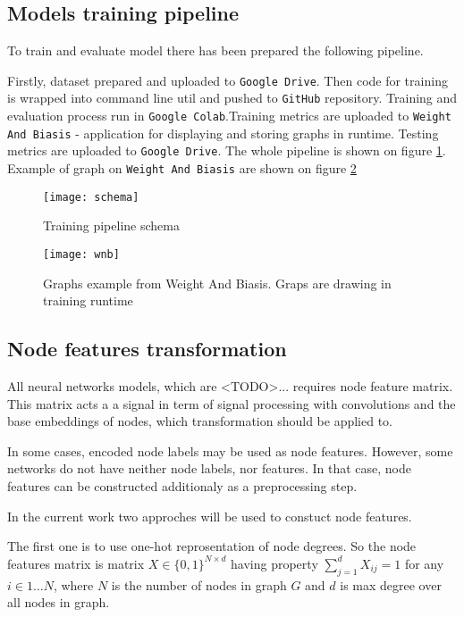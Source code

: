 \subsection{Models training pipeline}


To train and evaluate model there has been prepared the following pipeline.

Firstly, dataset prepared and uploaded to \texttt{Google Drive}. Then code for training is wrapped
into command line util and pushed to \texttt{GitHub} repository. Training and evaluation process run
in \texttt{Google Colab}.Training metrics are uploaded to \texttt{Weight And Biasis} - application for displaying
and storing graphs in runtime. Testing metrics are uploaded to \texttt{Google Drive}.
The whole pipeline is shown on figure \ref{fig:pipeline}. Example of graph on  \texttt{Weight And Biasis}
are shown on figure \ref{fig:wnb}

\begin{figure}[t]
    \centering
    \texttt{[image: schema]}
    \caption{Training pipeline schema}
    \label{fig:pipeline}
\end{figure}


\begin{figure}[h]
    \centering
    \texttt{[image: wnb]}
    \caption{Graphs example from Weight And Biasis. Graps are drawing in training runtime}
    \label{fig:wnb}
\end{figure}

\subsection{Node features transformation}



All neural networks models, which are  <TODO>... requires node feature matrix. This matrix
acts a a signal in term of signal processing with convolutions and the base embeddings of nodes,
which transformation should be applied to.

In some cases, encoded node labels may be used as node features. However, some networks
do not have neither node labels, nor features.
In that case, node features can be constructed additionaly as a preprocessing step.

In the current work two approches will be used to constuct node features.

The first one is to use one-hot reprosentation of node degrees. So the node features matrix
is matrix $X \in \{0,1\}^{N \times d}$ having property $\sum_{j=1}^{d}X_{ij} = 1$ for any $i \in 1 \dots N$,
where $N$ is the number of nodes in graph $G$ and $d$ is max degree over all nodes in graph.


